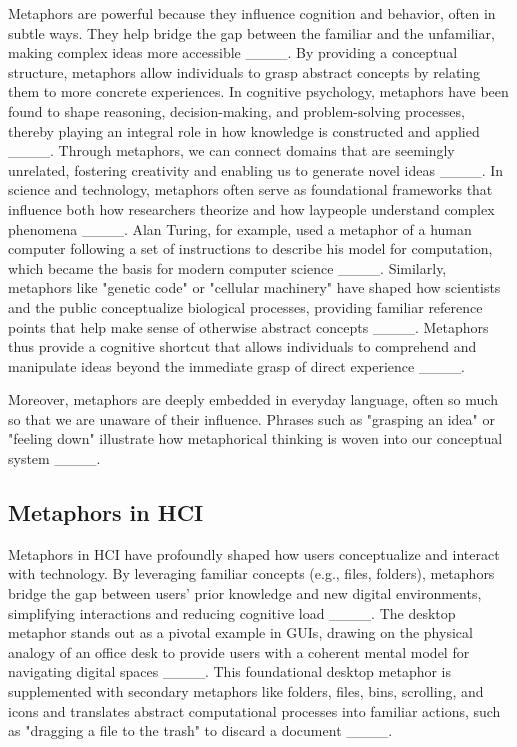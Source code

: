 Metaphors are powerful because they influence cognition and behavior, often in subtle ways. They help bridge the gap between the familiar and the unfamiliar, making complex ideas more accessible ____. By providing a conceptual structure, metaphors allow individuals to grasp abstract concepts by relating them to more concrete experiences. In cognitive psychology, metaphors have been found to shape reasoning, decision-making, and problem-solving processes, thereby playing an integral role in how knowledge is constructed and applied ____. Through metaphors, we can connect domains that are seemingly unrelated, fostering creativity and enabling us to generate novel ideas ____. In science and technology, metaphors often serve as foundational frameworks that influence both how researchers theorize and how laypeople understand complex phenomena ____. Alan Turing, for example, used a metaphor of a human computer following a set of instructions to describe his model for computation, which became the basis for modern computer science ____. Similarly, metaphors like "genetic code" or "cellular machinery" have shaped how scientists and the public conceptualize biological processes, providing familiar reference points that help make sense of otherwise abstract concepts ____. Metaphors thus provide a cognitive shortcut that allows individuals to comprehend and manipulate ideas beyond the immediate grasp of direct experience ____.

Moreover, metaphors are deeply embedded in everyday language, often so much so that we are unaware of their influence. Phrases such as "grasping an idea" or "feeling down" illustrate how metaphorical thinking is woven into our conceptual system ____.

\subsection{Metaphors in HCI}

Metaphors in HCI have profoundly shaped how users conceptualize and interact with technology. By leveraging familiar concepts (e.g., files, folders), metaphors bridge the gap between users' prior knowledge and new digital environments, simplifying interactions and reducing cognitive load ____. The desktop metaphor stands out as a pivotal example in GUIs, drawing on the physical analogy of an office desk to provide users with a coherent mental model for navigating digital spaces ____. This foundational desktop metaphor is supplemented with secondary metaphors like folders, files, bins, scrolling, and icons and translates abstract computational processes into familiar actions, such as "dragging a file to the trash" to discard a document ____.


